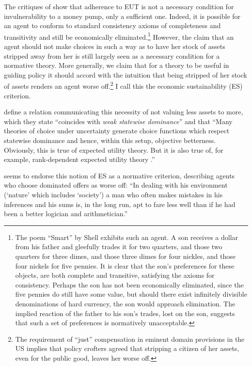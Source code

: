 \documentclass[../main.tex]{subfiles}
\begin{document}
The critiques of \textcite{Cubitt2001} show that adherence to EUT is not a necessary condition for invulnerability to a money pump, only a sufficient one.
Indeed, it is possible for an agent to conform to standard consistency axioms of completeness and transitivity and still be economically eliminated.\footnote{
	The poem \enquote{Smart} by Shell \textcite{Silverstein1974} exhibits such an agent.
	A son receives a dollar from his father and gleefully trades it for two quarters, and those two quarters for three dimes, and those three dimes for four nickles, and those four nickels for five pennies.
	It is clear that the son's preferences for these objects, are both complete and transitive, satisfying the axioms for consistency.
	Perhaps the son has not been economically eliminated, since the five pennies do still have some value, but should there exist infinitely divisible denominations of hard currency, the son would approach elimination.
	The implied reaction of the father to his son's trades, lost on the son, suggests that such a set of preferences is normatively unacceptable.
}
However, the claim that an agent should not make choices in such a way as to have her stock of assets stripped away from her is still largely seen as a necessary condition for a normative theory.
More generally, we claim that for a theory to be useful in guiding policy it should accord with the intuition that being stripped of her stock of assets renders an agent worse off.\footnote{
	The requirement of \enquote{just} compensation in eminent domain provisions in the US implies that policy crofters agreed that stripping a citizen of her assets, even for the public good, leaves her worse off.
}
I call this the economic sustainability (ES) criterion.

\textcite[141]{Cubitt2001} define a relation communicating this necessity of not valuing less assets to more, which they state \enquote{coincides with \textit{weak statewise dominance}} and that
\enquote{Many theories of choice under uncertainty generate choice functions which respect statewise dominance and hence, within this setup, objective betterness.
	Obviously, this is true of expected utility theory.
	But it is also true of, for example, \textcite{Quiggin1982} rank-dependent expected utility theory .}

\textcite[112]{Marschak1950} seems to endorse this notion of ES as a normative criterion, describing agents who choose dominated offers as worse off:
\enquote{In dealing with his environment (\enquote{nature} which includes \enquote{society}) a man who often makes mistakes in his inferences and his sums is, in the long run, apt to fare less well than if he had been a better logician and arithmetician.}
\end{document}
